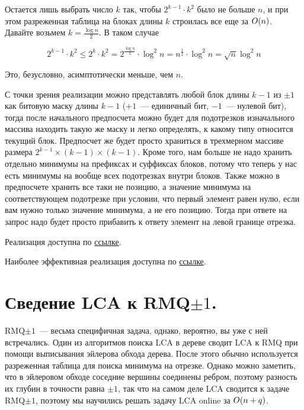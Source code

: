 Остается лишь выбрать число $k$ так, чтобы $2^{k - 1} \cdot k^2$ было не больше $n$, и при этом разреженная таблица на блоках длины $k$ строилась все еще за $O(n)$. Давайте возьмем $k = \frac{\log n}{2}$. В таком случае

$$2^{k - 1} \cdot k^2 \le 2^k \cdot k^2 = 2^{\frac{\log n}{2}} \cdot \log^2 n = n^{\frac{1}{2}} \cdot \log^2 n = \sqrt{n} \log^2 n$$

Это, безусловно, асимптотически меньше, чем $n$.

С точки зрения реализации можно представлять любой блок длины $k - 1$ из $\pm 1$ как битовую маску длины $k - 1$ ($+1$~--- единичный бит, $-1$~--- нулевой бит), тогда после начального предпосчета можно будет для подотрезков изначального массива находить такую же маску и легко определять, к какому типу относится текущий блок. Предпосчет же будет просто храниться в трехмерном массиве размера $2^{k - 1} \times (k - 1) \times (k - 1)$. Кроме того, нам больше не надо хранить отдельно минимумы на префиксах и суффиксах блоков, потому что теперь у нас есть минимумы на вообще всех подотрезках внутри блоков. Также можно в предпосчете хранить все таки не позицию, а значение минимума на соответствующем подотрезке при условии, что первый элемент равен нулю, если вам нужно только значение минимума, а не его позицию. Тогда при ответе на запрос надо будет просто прибавить к ответу элемент на левой границе отрезка.

Реализация доступна по \href{https://pastebin.com/jsu6Z6uR}{ссылке}.

Наиболее эффективная реализация доступна по \href{https://pastebin.com/FMfejPSk}{ссылке}.



\section{Сведение LCA к RMQ$\pm 1$.}

RMQ$\pm 1$~--- весьма специфичная задача, однако, вероятно, вы уже с ней встречались. Один из алгоритмов поиска LCA в дереве сводит LCA к RMQ при помощи выписывания эйлерова обхода дерева. После этого обычно используется разреженная таблица для поиска минимума на отрезке. Однако можно заметить, что в эйлеровом обходе соседние вершины соединены ребром, поэтому разность их глубин в точности равна $\pm 1$, так что на самом деле LCA сводится к задаче RMQ$\pm 1$, поэтому мы научились решать задачу LCA online за $O(n + q)$.

